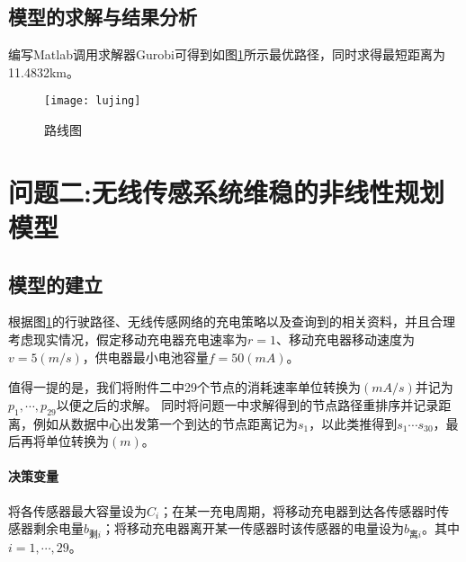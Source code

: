 \documentclass[withoutpreface,bwprint]{cumcmthesis} %
\begin{document}
\subsection{模型的求解与结果分析}
编写Matlab调用求解器Gurobi可得到如图\ref{fig:road}所示最优路径，同时求得最短距离为11.4832km。
\begin{figure}[!h]
    \centering
    \texttt{[image: lujing]}
    \caption{路线图}
    \label{fig:road}
\end{figure}








\section{问题二:无线传感系统维稳的非线性规划模型}
\subsection{模型的建立}
根据图\ref{fig:road}的行驶路径、无线传感网络的充电策略以及查询到的相关资料，并且合理考虑现实情况，假定移动充电器充电速率为$r=1$、移动充电器移动速度为$v=5(m/s)$，供电器最小电池容量$f=50(mA)$。\par
值得一提的是，我们将附件二中29个节点的消耗速率单位转换为$(mA/s)$并记为$p_1,\cdots,p_{29}$以便之后的求解。
同时将问题一中求解得到的节点路径重排序并记录距离，例如从数据中心出发第一个到达的节点距离记为$s_1$，以此类推得到$s_1\cdots s_{30}$，最后再将单位转换为$(m)$。
\paragraph{决策变量}将各传感器最大容量设为$C_i$；在某一充电周期，将移动充电器到达各传感器时传感器剩余电量$b_{\text{剩}i}$；将移动充电器离开某一传感器时该传感器的电量设为$b_{\text{离}i}$。其中$i=1,\cdots,29$。
\end{document}
